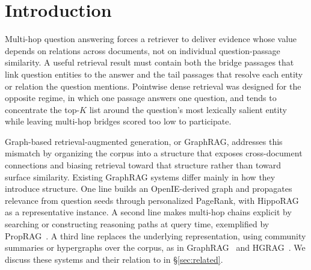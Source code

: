 %
%
%

\section{Introduction}
\label{sec:intro}

Multi-hop question answering forces a retriever to deliver evidence
whose value depends on relations across documents, not on individual
question-passage similarity. A useful retrieval result must contain both
the bridge passages that link question entities to the answer and the
tail passages that resolve each entity or relation the question
mentions. Pointwise dense retrieval was designed for the opposite
regime, in which one passage answers one question, and tends to
concentrate the top-$K$ list around the question's most lexically
salient entity while leaving multi-hop bridges scored too low to
participate.

Graph-based retrieval-augmented generation, or GraphRAG, addresses this
mismatch by organizing the corpus into a structure that exposes
cross-document connections and biasing retrieval toward that structure
rather than toward surface similarity. Existing GraphRAG systems differ
mainly in how they introduce structure. One line builds an
OpenIE-derived graph and propagates relevance from question seeds
through personalized PageRank, with
HippoRAG~\citep{jimenez2024hipporag,gutierrez2025hipporag} as a
representative instance. A second line makes multi-hop chains explicit
by searching or constructing reasoning paths at query time, exemplified
by PropRAG~\citep{wang2025proprag}. A third line replaces the underlying
representation, using community summaries or hypergraphs over the
corpus, as in GraphRAG~\citep{edge2024graphrag} and
HGRAG~\citep{hgrag2024}. We discuss these systems and their relation to
\methodname{} in \S\ref{sec:related}.

